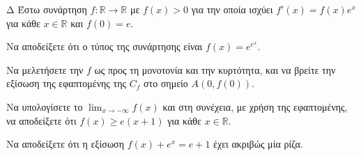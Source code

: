 \begin{thema}{Δ}
Έστω συνάρτηση $f: \mathbb{R} \to \mathbb{R}$ με $f(x)>0$ για την οποία ισχύει $f'(x) = f(x) e^x$ για κάθε $x \in \mathbb{R}$ και $f(0) = e$.
\begin{erwthma}
    \item Να αποδείξετε ότι ο τύπος της συνάρτησης είναι $f(x) = e^{e^x}$.
    \item Να μελετήσετε την $f$ ως προς τη μονοτονία και την κυρτότητα, και να βρείτε την εξίσωση της εφαπτομένης της $C_f$ στο σημείο $A(0, f(0))$.
    \item Να υπολογίσετε το $\displaystyle \lim_{x\to -\infty} f(x)$ και στη συνέχεια, με χρήση της εφαπτομένης, να αποδείξετε ότι $f(x) \ge e(x+1)$ για κάθε $x \in \mathbb{R}$.
    \item Να αποδείξετε ότι η εξίσωση $f(x) + e^x = e + 1$ έχει ακριβώς μία ρίζα.
\end{erwthma}
\end{thema}
